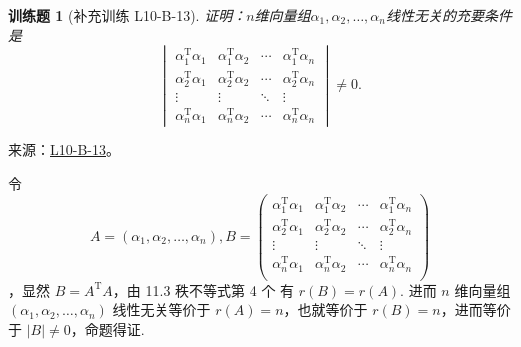 \documentclass[UTF8,12pt,a4paper,fontset=fandol]{ctexart}
\newtheorem{exercise}{训练题}[section]
\begin{document}
\begin{exercise}[补充训练 L10-B-13]\label{prob:L10-B-13}
证明：$n$维向量组$\alpha_1,\alpha_2,\ldots,\alpha_n$线性无关的充要条件是
        \[\begin{vmatrix}
                \alpha_1^\mathrm{T}\alpha_1 & \alpha_1^\mathrm{T}\alpha_2 & \cdots & \alpha_1^\mathrm{T}\alpha_n \\
                \alpha_2^\mathrm{T}\alpha_1 & \alpha_2^\mathrm{T}\alpha_2 & \cdots & \alpha_2^\mathrm{T}\alpha_n \\
                \vdots                      & \vdots                      & \ddots & \vdots                      \\
                \alpha_n^\mathrm{T}\alpha_1 & \alpha_n^\mathrm{T}\alpha_2 & \cdots & \alpha_n^\mathrm{T}\alpha_n
            \end{vmatrix}\neq 0.\]
\end{exercise}
\noindent 来源：\href{https://github.com/yhwu-is/Linear-Algebra-Left-Undone/blob/new/%E8%AE%B2%E4%B9%89/%E4%B8%93%E9%A2%98/10%20%E8%A1%8C%E5%88%97%E5%BC%8F.tex}{L10-B-13}。
\begin{solve}
令 
\[A = (\alpha_1, \alpha_2, \ldots, \alpha_n), B = \begin{pmatrix}
                \alpha_1^{\mathrm{T}}\alpha_1 & \alpha_1^{\mathrm{T}}\alpha_2 & \cdots & \alpha_1^{\mathrm{T}}\alpha_n \\
                \alpha_2^{\mathrm{T}}\alpha_1 & \alpha_2^{\mathrm{T}}\alpha_2 & \cdots & \alpha_2^{\mathrm{T}}\alpha_n \\
                \vdots                        & \vdots                        & \ddots & \vdots                        \\
                \alpha_n^{\mathrm{T}}\alpha_1 & \alpha_n^{\mathrm{T}}\alpha_2 & \cdots & \alpha_n^{\mathrm{T}}\alpha_n \\
            \end{pmatrix}\]
，显然 $B = A^{\mathrm{T}}A$，由 {11.3 秩不等式第 4 个} 有 $r(B) = r(A)$. 进而 $n$ 维向量组 $(\alpha_1, \alpha_2, \ldots, \alpha_n)$ 线性无关等价于 $r(A) = n$，也就等价于 $r(B) = n$，进而等价于 $\lvert B \rvert \neq 0$，命题得证.
\end{solve}
\end{document}
